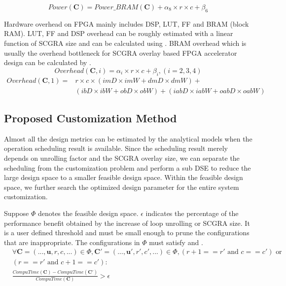 \begin{equation} \label{eq:totalpower}
    Power(\bm{C})=Power\_BRAM(\bm{C})+\alpha_8 \times r \times c + \beta_6
\end{equation}

Hardware overhead on FPGA mainly includes DSP, LUT, FF and 
BRAM (block RAM). LUT, FF and DSP overhead can be roughly estimated 
with a linear function of SCGRA size and can be calculated using . 
BRAM overhead which is usually the overhead bottleneck for SCGRA overlay based 
FPGA accelerator design can be calculated by .
\begin{equation} \label{eq:dsplutff}
    Overhead(\bm{C}, i)=\alpha_i \times r \times c + \beta_i, (i=2,3,4)
\end{equation}
\begin{equation} \label{eq:bramoverhead}
    \begin{split}
        Overhead(\bm{C}, 1)=&r \times c \times (imD \times imW + dmD \times dmW) + \\
                               &(ibD \times ibW + obD \times obW) + (iabD \times iabW + oabD \times oabW) 
    \end{split}
\end{equation}

\subsection{Proposed Customization Method}
Almost all the design metrics can be estimated by the analytical models when 
the operation scheduling result is available. Since the scheduling result 
merely depends on unrolling factor and the SCGRA overlay size, we can separate 
the scheduling from the customization problem and perform a sub DSE to 
reduce the large design space to a smaller feasible design space. Within 
the feasible design space, we further search the optimized design parameter 
for the entire system customization.

Suppose $\Phi$ denotes the feasible design space. $\epsilon$ indicates the
percentage of the performance benefit obtained by the increase 
of loop unrolling or SCGRA size. It is a user defined 
threshold and must be small enough to prune the configurations that are 
inappropriate. The configurations in $\Phi$ must satisfy  
and . 
\begin{equation} \label{eq:cond1}
    \begin{split}
        &\forall \bm{C}=(...,\bm{u},r,c,...)\in \Phi, \bm{C'}=(...,\bm{u'},r',c',...) \in
        \Phi,(r+1==r' \text{ and } c==c') \text{ or } \\ 
        &(r==r' \text{ and } c+1==c'): \\ 
        &\frac{CompuTime(\bm{C})-CompuTime(\bm{C'})}{CompuTime(\bm{C})} > \epsilon \\
    \end{split}
\end{equation}

